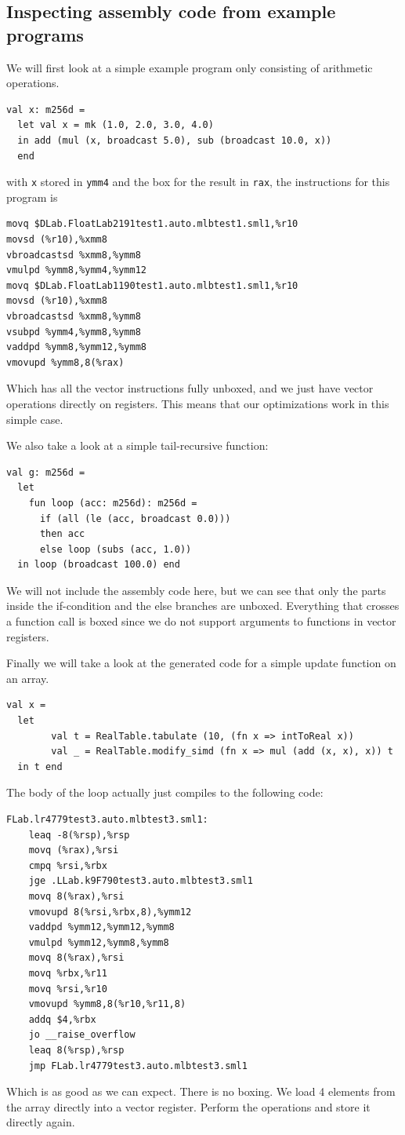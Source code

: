 \documentclass{article}
\begin{document}
\subsection{Inspecting assembly code from example programs}

We will first look at a simple example program only consisting of arithmetic operations.
\begin{verbatim}
val x: m256d = 
  let val x = mk (1.0, 2.0, 3.0, 4.0)
  in add (mul (x, broadcast 5.0), sub (broadcast 10.0, x))
  end
\end{verbatim}
with \verb!x! stored in \verb!ymm4! and the box for the result in \verb!rax!, the instructions for this program is
\begin{verbatim}
movq $DLab.FloatLab2191test1.auto.mlbtest1.sml1,%r10
movsd (%r10),%xmm8
vbroadcastsd %xmm8,%ymm8
vmulpd %ymm8,%ymm4,%ymm12
movq $DLab.FloatLab1190test1.auto.mlbtest1.sml1,%r10
movsd (%r10),%xmm8
vbroadcastsd %xmm8,%ymm8
vsubpd %ymm4,%ymm8,%ymm8
vaddpd %ymm8,%ymm12,%ymm8
vmovupd %ymm8,8(%rax)
\end{verbatim}
Which has all the vector instructions fully unboxed, and we just have vector operations directly on registers. This means that our optimizations work in this simple case.

We also take a look at a simple tail-recursive function:
\begin{verbatim}
val g: m256d =
  let
    fun loop (acc: m256d): m256d =
      if (all (le (acc, broadcast 0.0)))
      then acc
      else loop (subs (acc, 1.0))
  in loop (broadcast 100.0) end
\end{verbatim}
We will not include the assembly code here, but we can see that only the parts inside the if-condition and the else branches are unboxed. Everything that crosses a function call is boxed since we do not support arguments to functions in vector registers.

Finally we will take a look at the generated code for a simple update function on an array.
\begin{verbatim}
val x =
  let
        val t = RealTable.tabulate (10, (fn x => intToReal x))
        val _ = RealTable.modify_simd (fn x => mul (add (x, x), x)) t
  in t end
\end{verbatim}
The body of the loop actually just compiles to the following code:
\begin{verbatim}
FLab.lr4779test3.auto.mlbtest3.sml1:
	leaq -8(%rsp),%rsp
	movq (%rax),%rsi
	cmpq %rsi,%rbx
	jge .LLab.k9F790test3.auto.mlbtest3.sml1
	movq 8(%rax),%rsi
	vmovupd 8(%rsi,%rbx,8),%ymm12
	vaddpd %ymm12,%ymm12,%ymm8
	vmulpd %ymm12,%ymm8,%ymm8
	movq 8(%rax),%rsi
	movq %rbx,%r11
	movq %rsi,%r10
	vmovupd %ymm8,8(%r10,%r11,8)
	addq $4,%rbx
	jo __raise_overflow
	leaq 8(%rsp),%rsp
	jmp FLab.lr4779test3.auto.mlbtest3.sml1
\end{verbatim}
Which is as good as we can expect. There is no boxing. We load 4 elements from the array directly into a vector register. Perform the operations and store it directly again.
\end{document}
